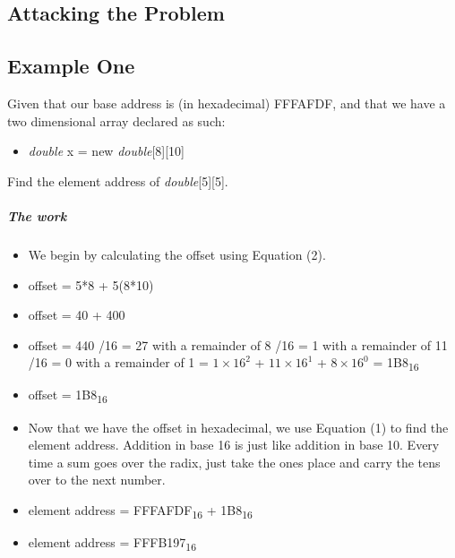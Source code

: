 \documentclass[12pt]{article}
\begin{document}
\newpage %



\begin{center}
\section{Attacking the Problem}
\end{center}
\subsection{Example One}
Given that our base address is (in hexadecimal) FFFAFDF, and that we have a two dimensional array declared as such:
\begin{itemize}[leftmargin=1.5em]
\item[] \textit{double} x = new \textit{double}[8][10]
\end{itemize}
Find the element address of \textit{double}[5][5].
\subparagraph{The work}
\begin{itemize}[leftmargin=1.5em]
\item[] We begin by calculating the offset using Equation (2).
\item[] offset = 5*8 + 5(8*10)
\item[] offset = 40 + 400
\item[] offset = 440
/16 = 27 with a remainder of 8
/16 = 1 with a remainder of 11
/16 = 0 with a remainder of 1
 = $1\times16^2$ + $11\times16^1$ + $8\times16^0$
 = 1B8\textsubscript{16}
\item[] offset = 1B8\textsubscript{16}
\item[] Now that we have the offset in hexadecimal, we use Equation (1) to find the element address. Addition in base 16 is just like addition in base 10. Every time a sum goes over the radix, just take the ones place and carry the tens over to the next number.
\item[] element address = FFFAFDF\textsubscript{16} + 1B8\textsubscript{16}
\item[] element address = FFFB197\textsubscript{16}
\end{itemize}
\end{document}
